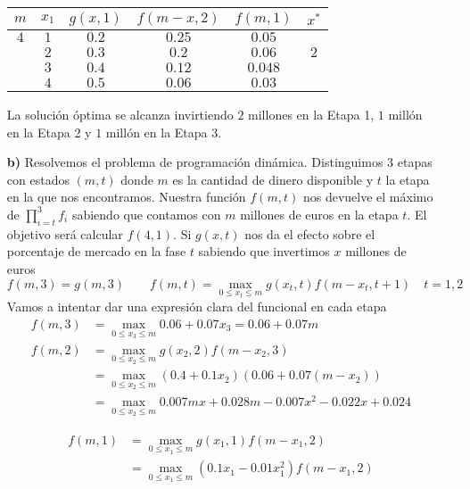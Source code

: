 \documentclass[twoside]{article}
\begin{document}
\begin{solucion}
\begin{itemize}
\begin{center}
\begin{tabular}{|c| c| c| c | c| c|}
\hline
$m$ & $x_1$ & $g(x,1)$ & $f(m-x,2)$ &  $f(m,1)$ & $x^* $ \\
\hline
$4$ & $1$ & $0.2$  & $0.25$  & $0.05$ & \\
\hline            
 & $2$    & $0.3$  &$0.2$ & $0.06$ &$\boxed{2}$\\
\hline            
 & $3$    & $0.4$  &$0.12$ & $0.048$ &\\
\hline
 & $4$ & $0.5$     & $0.06$ & $0.03$&\\
 \hline
\end{tabular}
\end{center}
La solución óptima se alcanza invirtiendo $2$ millones en la Etapa 1, $1$ millón en la Etapa 2 y $1$ millón en la Etapa 3.
\item[\textbf{b)}] Resolvemos el problema de programación dinámica. Distinguimos $3$ etapas con estados $(m,t)$ donde $m$ es la cantidad de dinero disponible y $t$ la etapa en la que nos encontramos. Nuestra función $f(m,t)$ nos devuelve el máximo de $\prod_{i=t}^3 f_i$ sabiendo que contamos con $m$ millones de euros en la etapa $t$. El objetivo será calcular $f(4,1)$. Si $g(x,t)$ nos da el efecto sobre el porcentaje de mercado en la fase $t$ sabiendo que invertimos $x$ millones de euros	
$$
f(m,3) = g(m,3) \qquad f(m,t)=\max_{0\leq x_t\leq m}g(x_t,t)f(m-x_t,t+1) \quad t=1,2
$$
Vamos a intentar dar una expresión clara del funcional en cada etapa
\begin{align*}
f(m,3)  &= \max_{0\leq x_3\leq m}0.06+0.07x_3 = 0.06+0.07m \\
f(m,2)  &= \max_{0\leq x_2\leq m}g(x_2,2)f(m-x_2,3)\\
		&= \max_{0\leq x_2\leq m}(0.4+0.1x_2)(0.06+0.07(m-x_2))\\
		&= \max_{0\leq x_2\leq m} 0.007 m x + 0.028 m - 0.007 x^2 - 0.022 x + 0.024
\end{align*}

\begin{align*}
f(m,1)  &=  \max_{0\leq x_1\leq m}g(x_1,1)f(m-x_1,2)\\
		&= \max_{0\leq x_1\leq m}(0.1x_1-0.01x_1^2)f(m-x_1,2)
\end{align*}

\end{itemize}
\end{solucion}

\newpage
\end{document}
